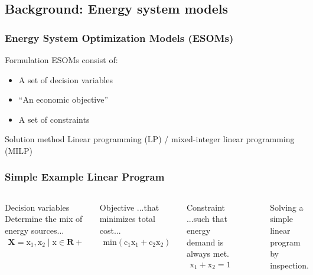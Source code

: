 \subsection{Background: Energy system models}
\begin{frame}
    \frametitle{Energy System Optimization Models (ESOMs)}
    
    \begin{block}{Formulation}
        ESOMs consist of:
        \begin{itemize}
            \item A set of decision variables
            \item ``An economic objective'' \cite{hobbs_optimization_1995}
            \item A set of constraints
        \end{itemize}
    \end{block}
    \begin{block}{Solution method}
        Linear programming (LP) / mixed-integer linear programming (MILP)
    \end{block}

\end{frame}

\begin{frame}
    \frametitle{Simple Example Linear Program}
    
    \begin{columns}
        \column[t]{4cm}
        \begin{block}{Decision variables}
            Determine the mix of energy sources...
            \begin{align}
                \mathbf{X} = {\mathrm{x}_1, \mathrm{x}_2 \mid \mathrm{x} \in \mathbf{R}+}
            \end{align}
        \end{block}
        \begin{block}{Objective}
            ...that minimizes total cost...
            \begin{align}
                \mathrm{min}\left(\mathrm{c}_1\mathrm{x}_1 + \mathrm{c}_2\mathrm{x}_2\right)
            \end{align}
        \end{block}
        \begin{block}{Constraint}
            ...such that energy demand is always met.
            \begin{align}
                \mathrm{x}_1 + \mathrm{x}_2 = 1
            \end{align}
        \end{block}
        \column[t]{6cm}
        \begin{figure}
            \centering
            \resizebox{\columnwidth}{!}{}
            \caption{Solving a simple linear program by inspection.}
            \label{fig:simple-lp}
        \end{figure}

    \end{columns}

\end{frame}

